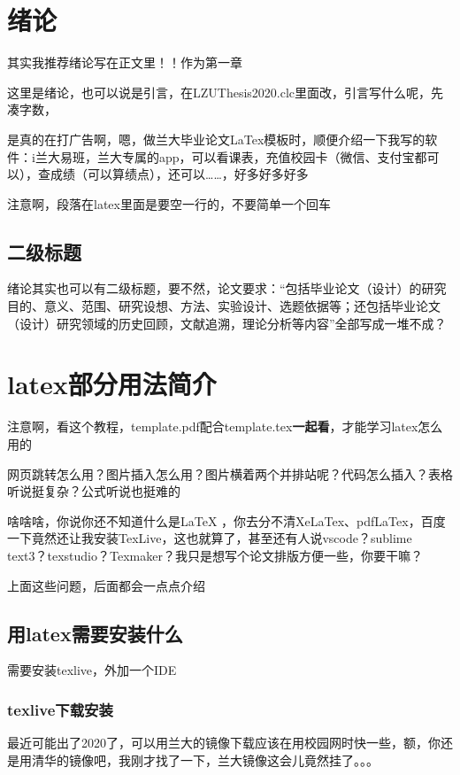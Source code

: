 \documentclass[AutoFakeBold]{LZUThesis2007}
\begin{document}
\tableofcontents


\mainmatter

\chapter{绪论}

其实我推荐绪论写在正文里！！作为第一章

    这里是绪论，也可以说是引言，在LZUThesis2020.clc里面改，引言写什么呢，先凑字数，

    是真的在打广告啊，嗯，做兰大毕业论文LaTex模板时，顺便介绍一下我写的软件：i兰大易班，兰大专属的app，可以看课表，充值校园卡（微信、支付宝都可以），查成绩（可以算绩点），还可以……，好多好多好多

    注意啊，段落在latex里面是要空一行的，不要简单一个回车

    \section{二级标题}
    绪论其实也可以有二级标题，要不然，论文要求：“包括毕业论文（设计）的研究目的、意义、范围、研究设想、方法、实验设计、选题依据等；还包括毕业论文（设计）研究领域的历史回顾，文献追溯，理论分析等内容”全部写成一堆不成？



\chapter{latex部分用法简介}

注意啊，看这个教程，template.pdf配合template.tex\textbf{一起看}，才能学习latex怎么用的

网页跳转怎么用？图片插入怎么用？图片横着两个并排站呢？代码怎么插入？表格听说挺复杂？公式听说也挺难的

啥啥啥，你说你还不知道什么是LaTeX ，你去分不清XeLaTex、pdfLaTex，百度一下竟然还让我安装TexLive，这也就算了，甚至还有人说vscode？sublime text3？texstudio？Texmaker？我只是想写个论文排版方便一些，你要干嘛？

上面这些问题，后面都会一点点介绍

\section{用latex需要安装什么}
需要安装texlive，外加一个IDE

\subsection{texlive下载安装}
最近可能出了2020了，可以用兰大的镜像下载应该在用校园网时快一些，额，你还是用清华的镜像吧，我刚才找了一下，兰大镜像这会儿竟然挂了。。。
\end{document}

